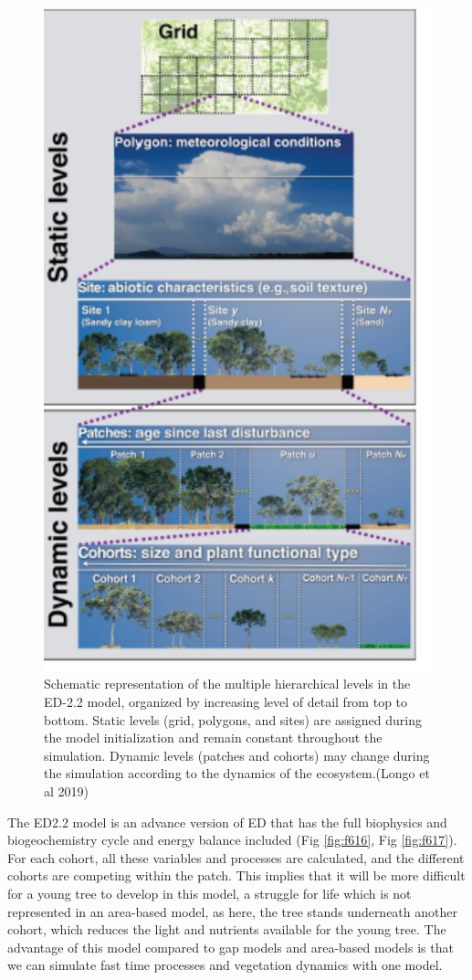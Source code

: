 \documentclass[12pt,oneside]{book}
\begin{document}
\begin{figure}

{\centering \includegraphics[width=0.8\linewidth]{figures/chap6/f615_ED_structure} 

}

\caption{Schematic representation of the multiple hierarchical levels in the ED-2.2 model, organized by increasing level of detail from top to bottom. Static levels (grid, polygons, and sites) are assigned during the model initialization and remain constant throughout the simulation. Dynamic levels (patches and cohorts) may change during the simulation according to the dynamics of the ecosystem.(Longo et al 2019)}\label{fig:f615}
\end{figure}

The ED2.2 model is an advance version of ED that has the full biophysics
and biogeochemistry cycle and energy balance included (Fig
\ref{fig:f616}, Fig \ref{fig:f617}). For each cohort, all these
variables and processes are calculated, and the different cohorts are
competing within the patch. This implies that it will be more difficult
for a young tree to develop in this model, a struggle for life which is
not represented in an area-based model, as here, the tree stands
underneath another cohort, which reduces the light and nutrients
available for the young tree. The advantage of this model compared to
gap models and area-based models is that we can simulate fast time
processes and vegetation dynamics with one model.
\end{document}
